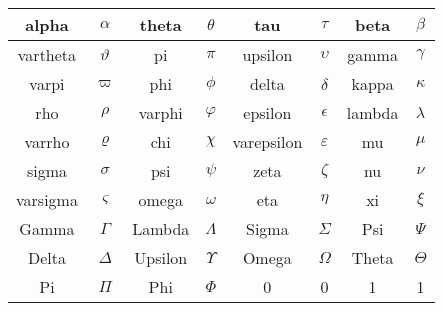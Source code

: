 \documentclass[UTF8]{article}
\begin{document}
\begin{tabular}{|c|c|c|c|c|c|c|c|} \hline
alpha    & $\alpha$    & theta   & $\theta$   & tau        & $\tau$        & beta   & $\beta$   \\ \hline
vartheta & $\vartheta$ & pi      & $\pi$      & upsilon    & $\upsilon$    & gamma  & $\gamma$  \\ \hline
varpi    & $\varpi$    & phi     & $\phi$     & delta      & $\delta$      & kappa  & $\kappa$  \\ \hline
rho      & $\rho$      & varphi  & $\varphi$  & epsilon    & $\epsilon$    & lambda & $\lambda$ \\ \hline
varrho   & $\varrho$   & chi     & $\chi$     & varepsilon & $\varepsilon$ & mu     & $\mu$     \\ \hline
sigma    & $\sigma$    & psi     & $\psi$     & zeta       & $\zeta$       & nu     & $\nu$     \\ \hline
varsigma & $\varsigma$ & omega   & $\omega$   & eta        & $\eta$        & xi     & $\xi$     \\ \hline
Gamma    & $\Gamma$    & Lambda  & $\Lambda$  & Sigma      & $\Sigma$      & Psi    & $\Psi$    \\ \hline
Delta    & $\Delta$    & Upsilon & $\Upsilon$ & Omega      & $\Omega$      & Theta  & $\Theta$  \\ \hline
Pi       & $\Pi$       & Phi     & $\Phi$     & 0          & 0             & 1      & 1         \\ \hline
\end{tabular} 
\end{document}
